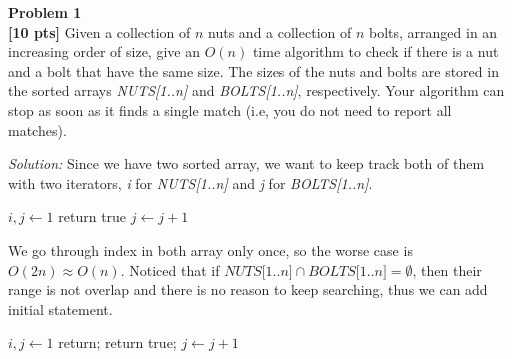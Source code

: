 \documentclass{article}
\newenvironment{problem}[2][Problem]
    { \begin{mdframed}[backgroundcolor=gray!20] \textbf{#1 #2} \\}
    {  \end{mdframed}}
\newenvironment{solution}
    {\textit{Solution:}}
    {}
\begin{document}
\begin{problem}{1}
\textbf{[10 pts]}
Given a collection of $n$ nuts and a collection of $n$ bolts, arranged in an increasing order of size, give an $O(n)$ time algorithm to check if there is a nut and a bolt that have the same size. The sizes of the nuts and bolts are stored in the sorted arrays \textit{NUTS[1..n]} and \textit{BOLTS[1..n]}, respectively. Your algorithm can stop as soon as it finds a single match (i.e, you do not need to report all matches).
\end{problem}
\begin{solution}
Since we have two sorted array, we want to keep track both of them with two iterators, \textit{i} for \textit{NUTS[1..n]} and \textit{j} for \textit{BOLTS[1..n]}.
\begin{algorithm}
	$i, j\gets 1$\;
	 {
		 {return true} 
		 {$j\gets j+1$}
	}
\end{algorithm} 
\newline
We go through index in both array only once, so the worse case is $O(2n) \approx O(n)$. \newline
Noticed that if $\textit{NUTS[1..n]} \cap \textit{BOLTS[1..n]} = \emptyset$, then their range is not overlap and there is no reason to keep searching, thus we can add initial statement.
\begin{algorithm}
	$i, j\gets 1$\;
	 {
		 {return;}
		 {return true;}
		 {$j\gets j+1$\;}
	}
\end{algorithm}
\end{solution}
\end{document}
